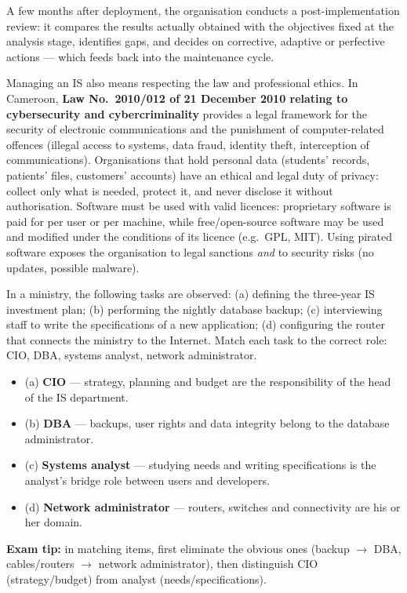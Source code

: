 \documentclass[11pt]{article}
\newcommand{\cle}[1]{{\popxbold\color{popdark}#1}}
\newcounter{popsec}
\newcounter{popsub}
\newcommand{\courssub}[1]{%
  \stepcounter{popsub}%
  \par\vspace{9pt}\noindent{\popxbold\fontsize{11.5}{13}\selectfont\color{popink}{\color{poporange}\thepopsec.\thepopsub}\hspace{6pt}#1}\par\nopagebreak\vspace{4pt}
}
\begin{document}
A few months after deployment, the organisation conducts a \cle{post-implementation review}: it compares the results actually obtained with the objectives fixed at the analysis stage, identifies gaps, and decides on corrective, adaptive or perfective actions — which feeds back into the maintenance cycle.

\courssub{Legal and Ethical Aspects}

Managing an IS also means respecting the law and professional ethics. In Cameroon, \textbf{Law No.~2010/012 of 21 December 2010 relating to cybersecurity and cybercriminality} provides a legal framework for the security of electronic communications and the punishment of computer-related offences (illegal access to systems, data fraud, identity theft, interception of communications). Organisations that hold personal data (students' records, patients' files, customers' accounts) have an ethical and legal duty of \cle{privacy}: collect only what is needed, protect it, and never disclose it without authorisation. Software must be used with valid \cle{licences}: proprietary software is paid for per user or per machine, while free/open-source software may be used and modified under the conditions of its licence (e.g.\ GPL, MIT). Using pirated software exposes the organisation to legal sanctions \emph{and} to security risks (no updates, possible malware).

\begin{exoresolu}
In a ministry, the following tasks are observed: (a) defining the three-year IS investment plan; (b) performing the nightly database backup; (c) interviewing staff to write the specifications of a new application; (d) configuring the router that connects the ministry to the Internet. Match each task to the correct role: CIO, DBA, systems analyst, network administrator.
\tcblower
\begin{itemize}
\item (a) \textbf{CIO} — strategy, planning and budget are the responsibility of the head of the IS department.
\item (b) \textbf{DBA} — backups, user rights and data integrity belong to the database administrator.
\item (c) \textbf{Systems analyst} — studying needs and writing specifications is the analyst's bridge role between users and developers.
\item (d) \textbf{Network administrator} — routers, switches and connectivity are his or her domain.
\end{itemize}
\textbf{Exam tip:} in matching items, first eliminate the obvious ones (backup $\rightarrow$ DBA, cables/routers $\rightarrow$ network administrator), then distinguish CIO (strategy/budget) from analyst (needs/specifications).
\end{exoresolu}
\end{document}

